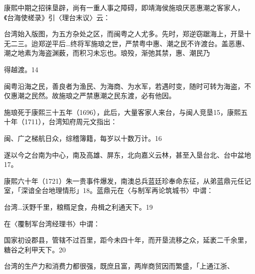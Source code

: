 康熙中期之招徕垦辟，尚有一重人事之障碍，即靖海侯施琅厌恶惠潮之客家人，《台海使槎录》引〈理台末议〉云：

\begin{BookQuote}
台湾始入版图，为五方杂处之区，而闽粤之人尤多。先时，郑逆窃踞海上，开垦十无二三。迨郑逆平后…终将军施琅之世，严禁粤中惠、潮之民不许渡台。盖恶惠、潮之地素为海盗渊薮，而积习未忘也。琅殁，渐弛其禁，惠、潮民乃
\end{BookQuote}

\vfill
\begin{BookNotes}
\end{BookNotes}

得越渡。14

闽粤沿海之民，善良者为渔民、为海商、为水军，若遇时变，随时可转为海盗，不仅惠潮之民然。故施琅之严禁惠潮之民东渡，必有他因。

施琅死于康熙三十五年（1696），此后，大量客家人来台，与闽人竞垦15，康熙五十年（1711），台湾知府周元文指出：

\begin{BookQuote}
闽、广之梯航日众，综稽簿籍，每岁以十数万计。16
\end{BookQuote}

遂以今之台南为中心，南及高雄、屏东，北向嘉义云林，甚至入垦台北、台中盆地17。

康熙六十年（1721）朱一贵事件爆发，南澳总兵蓝廷珍奉命东征，从弟蓝鼎元任记室，「深谙全台地理情形」18。蓝鼎元在〈与制军再论筑城书〉中谓：

\begin{BookQuote}
台湾…沃野千里，粮糈足食，舟楫之利通天下。19
\end{BookQuote}

在〈覆制军台湾经理书〉中谓：

\begin{BookQuote}
国家初设郡县，管辖不过百里，距今未四十年，而开垦流移之众，延袤二千余里，糖谷之利甲天下。20
\end{BookQuote}

台湾的生产力和消费力都很强，既庶且富，两岸商贸因而繁盛，「上通江浙、

